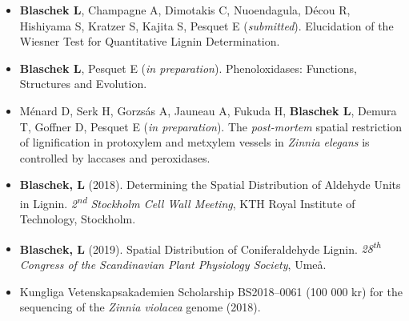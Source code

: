 \documentclass[11pt]{article}
\begin{document}
\vspace{-0.175cm}
\begin{itemize}[label={},itemindent=-9pt,leftmargin=24pt]
	\itemsep-0.1cm
	\item \textbf{Blaschek L}, Champagne A, Dimotakis C, Nuoendagula, Décou R, Hishiyama S, Kratzer S, Kajita S, Pesquet E (\textit{submitted}). Elucidation of the Wiesner Test for Quantitative Lignin Determination.
	\item \textbf{Blaschek L}, Pesquet E (\textit{in preparation}). Phenoloxidases: Functions, Structures and Evolution.
	\item Ménard D, Serk H, Gorzsás A, Jauneau A, Fukuda H, \textbf{Blaschek L}, Demura T, Goffner D, Pesquet E (\textit{in preparation}). The \textit{post-mortem} spatial restriction of lignification in protoxylem and metxylem vessels in \textit{Zinnia elegans} is controlled by laccases and peroxidases.
\end{itemize}
\vspace{0.3cm}

\vspace{-0.175cm}
\begin{itemize}[label={},itemindent=-9pt,leftmargin=24pt]
	\itemsep-0.1cm
	\item \textbf{Blaschek, L} (2018). Determining the Spatial Distribution of Aldehyde Units in Lignin. \textit{2\textsuperscript{nd} Stockholm Cell Wall Meeting}, KTH Royal Institute of Technology, Stockholm.
	\item \textbf{Blaschek, L} (2019). Spatial Distribution of Coniferaldehyde Lignin. \textit{28\textsuperscript{th} Congress of the Scandinavian Plant Physiology Society}, Umeå.
\end{itemize}
\vspace{0.3cm}

\vspace{-0.175cm}
\begin{itemize}[label={},itemindent=-9pt,leftmargin=24pt]
	\itemsep-0.1cm
	\item Kungliga Vetenskapsakademien Scholarship BS2018--0061 (100 000 kr) for the sequencing of the \textit{Zinnia violacea} genome (2018). 
\end{itemize}
\newpage
\end{document}
